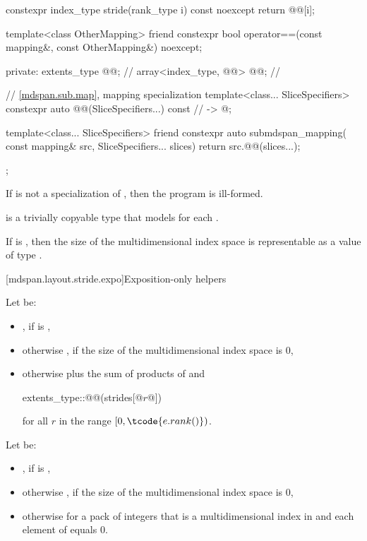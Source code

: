 \begin{codeblock}
{{    constexpr index_type stride(rank_type i) const noexcept { return @@[i]; }

    template<class OtherMapping>
      friend constexpr bool operator==(const mapping&, const OtherMapping&) noexcept;

  private:
    extents_type @@{};                    // \expos
    array<index_type, @@> @@{};        // \expos

    // \ref{mdspan.sub.map},  mapping specialization
    template<class... SliceSpecifiers>
      constexpr auto @@(SliceSpecifiers...) const       // \expos
        -> @\seebelow@;

    template<class... SliceSpecifiers>
      friend constexpr auto submdspan_mapping(
        const mapping& src, SliceSpecifiers... slices) {
          return src.@@(slices...);
      }
  };
}
\end{codeblock}

\pnum
If  is not a specialization of ,
then the program is ill-formed.

\pnum
{} is a trivially copyable type
that models  for each .

\pnum
\mandates
If  is ,
then the size of the multidimensional index space 
is representable as a value of type .

[mdspan.layout.stride.expo]{Exposition-only helpers}

\pnum
Let  be:
\begin{itemize}
\item
{}, if  is ,
\item
otherwise , if the size of the multidimensional index space  is 0,
\item
otherwise  plus the sum of products of
 and
\begin{codeblock}
extents_type::@@(strides[@$r$@])
\end{codeblock}
  for all $r$ in the range $[0, \tcode{e.rank()})$.
\end{itemize}

\pnum
Let  be:
\begin{itemize}
\item
{}, if  is ,
\item
otherwise , if the size of the multidimensional index space  is 0,
\item
otherwise  for a pack of integers 
that is a multidimensional index in  and
each element of  equals 0.
\end{itemize}

